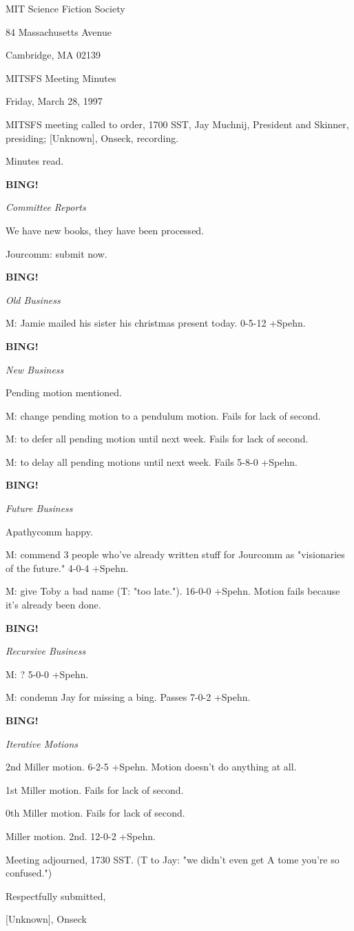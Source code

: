 \documentclass[12pt]{article}
\newcommand{\bing}{{\bf BING!} }
\newcommand{\goto}[1]{\bing \vskip 12pt \centerline{{\em{#1}}}}
\begin{document}
\begin{center}

MIT Science Fiction Society 

84 Massachusetts Avenue

Cambridge, MA 02139

\vspace{12pt}

MITSFS Meeting Minutes 

Friday, March 28, 1997

\end{center}
 
\vspace{18pt}

\setlength{\parskip}{6pt}

\noindent
MITSFS meeting called to order, 1700 SST,
Jay Muchnij, President and Skinner, presiding; [Unknown], Onseck, recording.

Minutes read.

\goto{Committee Reports}

We have new books, they have been processed.

Jourcomm: submit now.

\goto{Old Business}

M: Jamie mailed his sister his christmas present today. 0-5-12 +Spehn.

\goto{New Business}

Pending motion mentioned.

M: change pending motion to a pendulum motion. Fails for lack of second.

M: to defer all pending motion until next week. Fails for lack of second.

M: to delay all pending motions until next week. Fails 5-8-0 +Spehn.

\goto{Future Business}

Apathycomm happy.

M: commend 3 people who've already written stuff for Jourcomm as "visionaries of the future." 4-0-4 +Spehn.

M: give Toby a bad name (T: "too late."). 16-0-0 +Spehn. Motion fails because it's already been done.

\goto{Recursive Business}

M: ? 5-0-0 +Spehn.

M: condemn Jay for missing a bing. Passes 7-0-2 +Spehn.

\goto{Iterative Motions}

2nd Miller motion. 6-2-5 +Spehn. Motion doesn't do anything at all.

1st Miller motion. Fails for lack of second.

0th Miller motion. Fails for lack of second.

Miller motion. 2nd. 12-0-2 +Spehn.

\vspace{12pt}

\noindent
Meeting adjourned, 1730 SST. (T to Jay: "we didn't even get A tome you're so confused.")

\vspace{18pt}

\centerline{Respectfully submitted,}
\centerline{[Unknown], Onseck}
\end{document}
